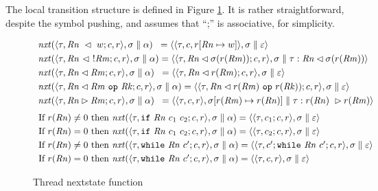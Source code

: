 The local transition structure is defined in Figure \ref{RewriteRelation}. It is rather straightforward, despite the symbol pushing, and assumes that ``;'' is associative, for simplicity.

\begin{figure}[t]
{\small
\[
\begin{array}{l}
\Next(\langle\tid,\Rn\ \ReadFrom\ w;c,\regs\rangle,\store\parallel\alpha)\;\; = \langle \langle \tid,c,\regs[\Rn\mapsto w]\rangle,\store\parallel\varepsilon\rangle \\[3pt]

\Next(\langle\tid,\Rn\ \ReadFrom\ !\Rm;c,\regs\rangle,\store\parallel\alpha) = \langle \langle \tid,\Rn \ReadFrom\store(\regs(\Rm));c,\regs\rangle,\store\parallel \tid:\Rn \ReadFrom \store(\regs(\Rm))\rangle \\[3pt]

\Next(\langle\tid,\Rn\ReadFrom \Rm;c,\regs\rangle,\store\parallel\alpha)\;\; = \langle \langle\tid,\Rn \ReadFrom\regs(\Rm);c,\regs\rangle,\store\parallel\varepsilon\rangle \\[3pt]

\Next(\langle\tid,\Rn\ReadFrom \Rm\ \Op\ \Rk;c,\regs\rangle,\store\parallel\alpha) = \langle \langle\tid,\Rn \ReadFrom\regs(\Rm)\ \Op\ \regs(\Rk));c,\regs\rangle,\store\parallel\varepsilon\rangle \\[3pt]

\Next(\langle\tid,\Rn\WriteTo \Rm;c,\regs\rangle,\store\parallel\alpha)\;\; = \langle \langle \tid,c,\regs\rangle,\store[\regs(\Rm) \mapsto \regs(\Rn)]\parallel\tid:\regs(\Rn)\ \WriteTo \regs(\Rm) \rangle 
\end{array}
\]
\[
\begin{array}{ll}
\mbox{If }\regs(\Rn) \neq 0\mbox{ then } \Next(\langle\tid,\If\ \Rn\ c_1\ c_2 ; c,\regs\rangle,\store\parallel\alpha) = \langle \langle \tid, c_1 ; c,\regs\rangle,\store\parallel\varepsilon \rangle \\[3pt]

\mbox{If }\regs(\Rn) = 0\mbox{ then } \Next(\langle\tid,\If\ \Rn\ c_1\ c_2 ; c,\regs\rangle,\store\parallel\alpha) = \langle \langle \tid,c_2 ; c,\regs\rangle,\store\parallel\varepsilon\rangle \\[3pt]

\mbox{If }\regs(\Rn) \neq 0\mbox{ then } \Next(\langle\tid,\While\ \Rn\ c' ;c,\regs\rangle,\store\parallel\alpha) = \langle \langle \tid,c';\While\ \Rn\ c' ; c,\regs\rangle,\store\parallel\varepsilon\rangle \\[3pt]

\mbox{If }\regs(\Rn) = 0\mbox{ then }\Next(\langle \tid,\While\ \Rn\ c' ; c,\regs\rangle,\store\parallel\alpha)  = \langle \langle \tid,c,\regs\rangle,\store\parallel\varepsilon \rangle
\end{array}
\]
}
%
\caption{Thread nextstate function}
\label{RewriteRelation}
\end{figure}
